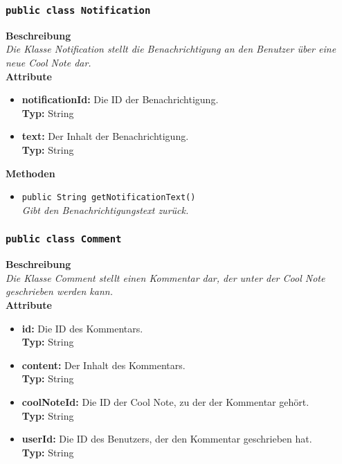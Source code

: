 \subsubsection{\texttt{public class Notification}}

	\textbf{Beschreibung} \\
	\textit{Die Klasse Notification stellt die Benachrichtigung an den Benutzer über eine neue Cool Note dar.} \\
	
	\textbf{Attribute}
	\begin{itemize}
		\item \textbf{notificationId:} Die ID der Benachrichtigung. \\
		\textbf{Typ:} String
		\item \textbf{text:} Der Inhalt der Benachrichtigung. \\
		\textbf{Typ:} String
	\end{itemize}
	
	\textbf{Methoden}
	\begin{itemize}
		\item\texttt{{public String getNotificationText()}}\\
		\textit{Gibt den Benachrichtigungstext zurück.}\\
	\end{itemize}

\subsubsection{\texttt{public class Comment}}

	\textbf{Beschreibung} \\
	\textit{Die Klasse Comment stellt einen Kommentar dar, der unter der Cool Note geschrieben werden kann.} \\
	
	\textbf{Attribute}
	\begin{itemize}
		\item \textbf{id:} Die ID des Kommentars. \\
		\textbf{Typ:} String
		\item \textbf{content:} Der Inhalt des Kommentars. \\
		\textbf{Typ:} String
		\item \textbf{coolNoteId:} Die ID der Cool Note, zu der der Kommentar gehört. \\
		\textbf{Typ:} String
		\item \textbf{userId:} Die ID des Benutzers, der den Kommentar geschrieben hat.\\
		\textbf{Typ:} String
	\end{itemize}
	
